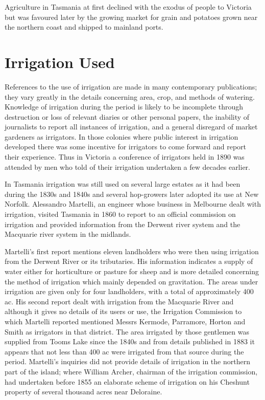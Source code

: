 Agriculture in Tasmania at first declined with the exodus of people to
Victoria but was favoured later by the growing market for grain and
potatoes grown near the northern coast and shipped to mainland ports.

\section*{Irrigation Used}

References to the use of irrigation are made in many contemporary
publications; they vary greatly in the details concerning area, crop,
and methods of watering.  Knowledge of irrigation during the period is
likely to be incomplete through destruction or loss of relevant
diaries or other personal papers, the inability of journalists to
report all instances of irrigation, and a general disregard of market
gardeners as irrigators.  In those colonies where public interest in
irrigation developed there was some incentive for irrigators to come
forward and report their experience.  Thus in Victoria a conference of
irrigators held in 1890 was attended by men who told of their
irrigation undertaken a few decades earlier.

In Tasmania irrigation was still used on several large estates as it
had been during the 1830s and 1840s and several hop-growers later
adopted its use at New Norfolk.  Alessandro Martelli, an engineer
whose business in Melbourne dealt with irrigation, visited Tasmania in
1860 to report to an official commission on irrigation and provided
information from the Derwent river system and the Macquarie river
system in the midlands.

Martelli's first report mentions eleven landholders who were then
using irrigation from the Derwent River or its tributaries.  His
information indicates a supply of water either for horticulture or
pasture for sheep and is more detailed concerning the method of
irrigation which mainly depended on gravitation.  The areas under
irrigation are given only for four landholders, with a total of
approximately 400\,ac.  His second report dealt with irrigation from
the Macquarie River and although it gives no details of its users or
use, the Irrigation Commission to which Martelli reported mentioned
Messrs Kermode, Parramore, Horton and Smith as irrigators in that
district.  The area irrigated by those gentlemen was supplied from
Tooms Lake since the 1840s and from details published in 1883 it
appears that not less than 400 ac were irrigated from that source
during the period.  Martelli's inquiries did not provide details of
irrigation in the northern part of the island; where William Archer,
chairman of the irrigation commission, had undertaken before 1855 an
elaborate scheme of irrigation on his Cheshunt property of several
thousand acres near Deloraine.


